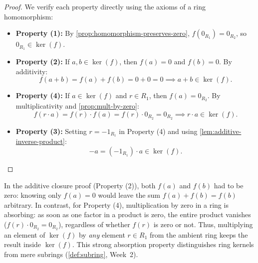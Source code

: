 \begin{content}

\begin{proof}
We verify each property directly using the axioms of a ring homomorphism:
\begin{itemize}
    \item \textbf{Property (1):} By \cref{prop:homomorphism-preserves-zero}, $f(0_{R_1}) = 0_{R_2}$, so $0_{R_1} \in \ker(f)$.
    \item \textbf{Property (2):} If $a, b \in \ker(f)$, then $f(a) = 0$ and $f(b) = 0$. By additivity:
    \[
    f(a + b) = f(a) + f(b) = 0 + 0 = 0 \implies a + b \in \ker(f).
    \]
    \item \textbf{Property (4):} If $a \in \ker(f)$ and $r \in R_1$, then $f(a) = 0_{R_2}$. By multiplicativity and \cref{prop:mult-by-zero}:
    \[
    f(r \cdot a) = f(r) \cdot f(a) = f(r) \cdot 0_{R_2} = 0_{R_2} \implies r \cdot a \in \ker(f).
    \]
    \item \textbf{Property (3):} Setting $r = -1_{R_1}$ in Property (4) and using \cref{lem:additive-inverse-product}:
    \[
    -a = (-1_{R_1}) \cdot a \in \ker(f).
    \]
\end{itemize}
\end{proof}

\begin{steps}
In the additive closure proof (Property (2)), both $f(a)$ and $f(b)$ had to be zero: knowing only $f(a) = 0$ would leave the sum $f(a) + f(b) = f(b)$ arbitrary. In contrast, for Property (4), multiplication by zero in a ring is absorbing: as soon as one factor in a product is zero, the entire product vanishes ($f(r) \cdot 0_{R_2} = 0_{R_2}$), regardless of whether $f(r)$ is zero or not. Thus, multiplying an element of $\ker(f)$ by \emph{any} element $r \in R_1$ from the ambient ring keeps the result inside $\ker(f)$. This strong absorption property distinguishes ring kernels from mere subrings (\cref{def:subring}, Week~2).
\end{steps}
\end{content}

